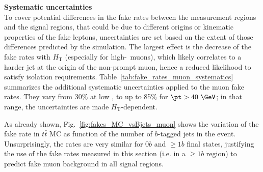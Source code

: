 \begin{table}[t!]
\def\arraystretch{1.15}
\caption{Additional systematic uncertainty on the muon fake rates, to address variations of the latter in different environments. 
The table also shows the correction factors and uncertainties applied to final states with $\ge 2$ $b$-tagged jets.}
\label{tab:fake_rates_muon_systematics}
\def\arraystretch{1.15}
\centering
{}
\end{table}


\par{\bf Systematic uncertainties\\}
To cover potential differences in the fake rates between the measurement regions and the signal regions, 
that could be due to different origins or kinematic properties of the fake leptons, 
uncertainties are set based on the extent of those differences predicted by the simulation. 
The largest effect is the decrease of the fake rates with $H_\mathrm{T}$ (especially for high-\pt\ muons), 
which likely correlates to a harder jet at the origin of the non-prompt muon, hence a reduced likelihood to satisfy isolation requirements. 
Table~\ref{tab:fake_rates_muon_systematics} summarizes the additional systematic uncertainties applied to the muon fake rates. 
They vary from $30\%$ at low \pt, to up to 85\% for $\pt>40~\GeV$; in that range, the uncertainties are made $H_\mathrm{T}$-dependent. 

As already shown, Fig.~\ref{fig:fakes_MC_vsBjets_muon} shows the variation of the fake rate in $t\bar t$ MC as function of the number of $b$-tagged jets in the event. 
Unsurprisingly, the rates are very similar for $0b$ and $\ge 1b$ final states, 
justifying the use of the fake rates measured in this section (i.e. in a $\ge 1b$ region) to predict fake muon background in all signal regions. 

